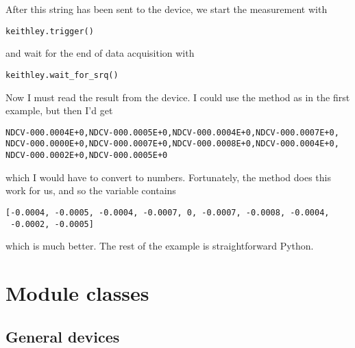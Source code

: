 \documentclass{howto}
\begin{document}
After this string has been sent to the device, we start the measurement with
\begin{verbatim}
keithley.trigger()
\end{verbatim}
and wait for the end of data acquisition with
\begin{verbatim}
keithley.wait_for_srq()
\end{verbatim}
Now I must read the result from the device.  I could use the 
method as in the first example, but then I'd get
\begin{verbatim}
NDCV-000.0004E+0,NDCV-000.0005E+0,NDCV-000.0004E+0,NDCV-000.0007E+0,
NDCV-000.0000E+0,NDCV-000.0007E+0,NDCV-000.0008E+0,NDCV-000.0004E+0,
NDCV-000.0002E+0,NDCV-000.0005E+0
\end{verbatim}
which I would have to convert to numbers.  Fortunately, the
 method does this work for us, and so the variable
 contains
\begin{verbatim}
[-0.0004, -0.0005, -0.0004, -0.0007, 0, -0.0007, -0.0008, -0.0004,
 -0.0002, -0.0005]
\end{verbatim}
which is much better.  The rest of the example is straightforward Python.


\section{Module classes}

\subsection{General devices}
\label{sec:general-devices}
\end{document}

